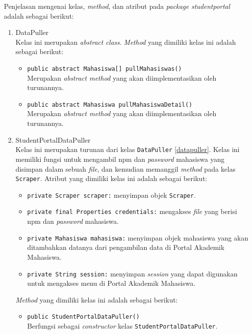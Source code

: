 Penjelasan mengenai kelas, \textit{method}, dan atribut pada \textit{package studentportal} adalah sebagai berikut:
\begin{enumerate}
    \item{DataPuller}\\
    \label{datapuller}
	Kelas ini merupakan \textit{abstract class}. \textit{Method} yang dimiliki kelas ini adalah sebagai berikut:
	\begin{itemize}
		\item \texttt{public abstract Mahasiswa[] pullMahasiswas()}\\
	    Merupakan \textit{abstract method} yang akan diimplementasikan oleh turunannya.
		
		\item \texttt{public abstract Mahasiswa pullMahasiswaDetail()}\\
        Merupakan \textit{abstract method} yang akan diimplementasikan oleh turunannya.
	\end{itemize}

	
	\item{StudentPortalDataPuller}\\
	Kelas ini merupakan turunan dari kelas \texttt{DataPuller} \ref{datapuller}. Kelas ini memiliki fungsi untuk mengambil npm dan \textit{password} mahasiswa yang disimpan dalam sebuah \textit{file}, dan kemudian memanggil \textit{method} pada kelas \texttt{Scraper}. Atribut yang dimiliki kelas ini adalah sebagai berikut:
	\begin{itemize}
        \item \texttt{private Scraper scraper:} menyimpan objek \texttt{Scraper}.
        \item \texttt{private final Properties credentials:} mengakses \textit{file} yang berisi npm dan \textit{password} mahasiswa.
        \item \texttt{private Mahasiswa mahasiswa:} menyimpan objek mahasiswa yang akan ditambahkan datanya dari pengambilan data di Portal Akademik Mahasiswa.
        \item \texttt{private String session:} menyimpan \textit{session} yang dapat digunakan untuk mengakses menu di Portal Akademik Mahasiswa.
	\end{itemize}
	
	\textit{Method} yang dimiliki kelas ini adalah sebagai berikut:
	\begin{itemize}
		\item \texttt{public StudentPortalDataPuller()}\\
		Berfungsi sebagai \textit{constructor} kelas \texttt{StudentPortalDataPuller}.
		

\end{itemize}
\end{enumerate}
